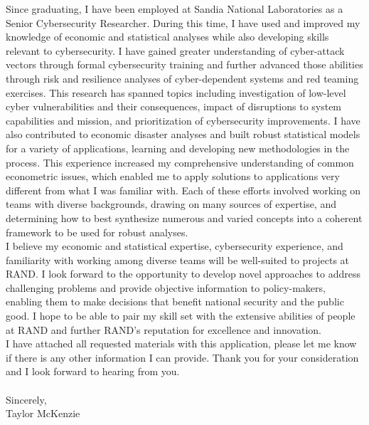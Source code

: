 \documentclass[]{article}
\begin{document}
Since graduating, I have been employed at Sandia National Laboratories as a Senior Cybersecurity Researcher. During this time, I have used and improved my knowledge of economic and statistical analyses while also developing skills relevant to cybersecurity. I have gained greater understanding of cyber-attack vectors through formal cybersecurity training and further advanced those abilities through risk and resilience analyses of cyber-dependent systems and red teaming exercises. This research has spanned topics including investigation of low-level cyber vulnerabilities and their consequences, impact of disruptions to system capabilities and mission, and prioritization of cybersecurity improvements. I have also contributed to economic disaster analyses and built robust statistical models for a variety of applications, learning and developing new methodologies in the process. This experience increased my comprehensive understanding of common econometric issues, which enabled me to apply solutions to applications very different from what I was familiar with. Each of these efforts involved working on teams with diverse backgrounds, drawing on many sources of expertise, and determining how to best synthesize numerous and varied concepts into a coherent framework to be used for robust analyses.\\

I believe my economic and statistical expertise, cybersecurity experience, and familiarity with working among diverse teams will be well-suited to projects at RAND. I look forward to the opportunity to develop novel approaches to address challenging problems and provide objective information to policy-makers, enabling them to make decisions that benefit national security and the public good. I hope to be able to pair my skill set with the extensive abilities of people at RAND and further RAND's reputation for excellence and innovation.\\

I have attached all requested materials with this application, please let me know if there is any other information I can provide. Thank you for your consideration and I look forward to hearing from you.\\\\


\noindent Sincerely,\\

\noindent Taylor McKenzie
\end{document}
